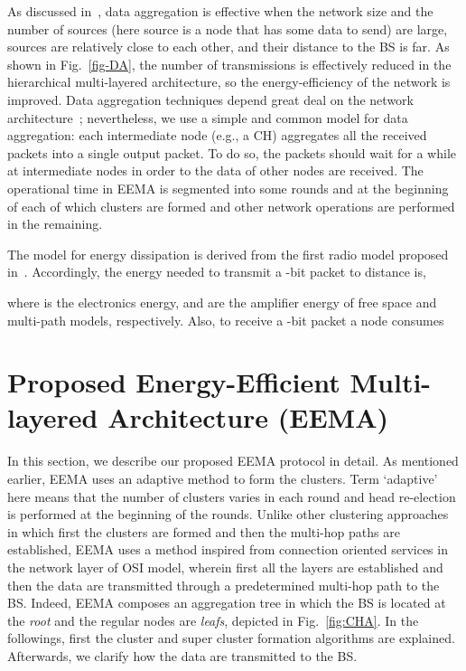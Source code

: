 \documentclass[journal]{IEEEtran}
\begin{document}
\begin{figure*}[t]
\centering
	\caption{A simple case study; a WSN with/without data aggregation.}
    \label{fig-DA}
\end{figure*}
 

As discussed in~\cite{impact}, data aggregation is effective when the network size and the number of sources (here source is a node that has some data to send) are large, sources are relatively close to each other, and their distance to the BS is far.  As shown in Fig.~\ref{fig-DA},  the number of transmissions is effectively reduced in the hierarchical multi-layered architecture, so the energy-efficiency of the network is improved.  Data aggregation techniques depend great deal on the network architecture~\cite{survey-DA}; nevertheless,  we use a simple and common model for data aggregation: each intermediate node (e.g., a CH) aggregates all the received packets into a single output packet.  To do so, the packets should wait for a while at intermediate nodes in order to the data of other nodes are received. The operational time in EEMA is segmented into some rounds and at the beginning of each of which clusters are formed and other network operations are performed in the remaining.

The model for energy dissipation is derived from the first radio model proposed in~\cite{Heinzelman2002}.  
Accordingly, the energy needed to transmit a -bit packet to distance  is,

where  is the electronics energy,   and  are the amplifier energy of free space and multi-path models, respectively.  Also, to receive a -bit packet a node consumes



\section{Proposed Energy-Efficient Multi-layered Architecture (EEMA)}
\label{sec:EEMA}
In this section, we describe our proposed EEMA protocol in detail. As mentioned earlier, EEMA uses an adaptive method to form the clusters.  Term `adaptive' here means that the number of clusters varies in each round and head re-election is performed at the beginning of the rounds.
Unlike other clustering approaches in which first the clusters are formed and then the multi-hop paths are established, EEMA uses a method inspired from connection oriented services in the network layer of OSI model, wherein first all the layers are established and then the data are transmitted through a predetermined multi-hop path to the BS.  Indeed, EEMA composes an aggregation tree in which the BS is located at the {\it root} and the regular nodes are {\it leafs}, depicted in Fig.~\ref{fig:CHA}.   In the followings, first the cluster and super cluster formation algorithms are explained. Afterwards, we clarify how the data are transmitted to the BS. 
\end{document}
